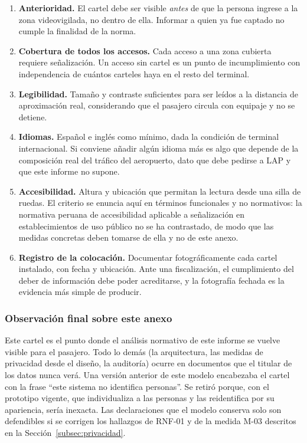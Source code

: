 \begin{enumerate}[leftmargin=1.6em,itemsep=0.35em]
  \item \textbf{Anterioridad.} El cartel debe ser visible \emph{antes} de
        que la persona ingrese a la zona videovigilada, no dentro de
        ella. Informar a quien ya fue captado no cumple la finalidad de
        la norma.
  \item \textbf{Cobertura de todos los accesos.} Cada acceso a una zona
        cubierta requiere señalización. Un acceso sin cartel es un punto
        de incumplimiento con independencia de cuántos carteles haya en
        el resto del terminal.
  \item \textbf{Legibilidad.} Tamaño y contraste suficientes para ser
        leídos a la distancia de aproximación real, considerando que el
        pasajero circula con equipaje y no se detiene.
  \item \textbf{Idiomas.} Español e inglés como mínimo, dada la condición
        de terminal internacional. Si conviene añadir algún idioma más es
        algo que depende de la composición real del tráfico del
        aeropuerto, dato que debe pedirse a LAP y que este informe no
        supone.
  \item \textbf{Accesibilidad.} Altura y ubicación que permitan la
        lectura desde una silla de ruedas. El criterio se enuncia aquí en
        términos funcionales y no normativos: la normativa peruana de
        accesibilidad aplicable a señalización en establecimientos de uso
        público no se ha contrastado, de modo que las medidas concretas
        deben tomarse de ella y no de este anexo.
  \item \textbf{Registro de la colocación.} Documentar fotográficamente
        cada cartel instalado, con fecha y ubicación. Ante una
        fiscalización, el cumplimiento del deber de información debe
        poder acreditarse, y la fotografía fechada es la evidencia más
        simple de producir.
\end{enumerate}

\subsubsection{Observación final sobre este anexo}

Este cartel es el punto donde el análisis normativo de este informe se
vuelve visible para el pasajero. Todo lo demás (la arquitectura, las
medidas de privacidad desde el diseño, la auditoría) ocurre en
documentos que el titular de los datos nunca verá. Una versión anterior
de este modelo encabezaba el cartel con la frase \enquote{este sistema no
identifica personas}. Se retiró porque, con el prototipo vigente, que
individualiza a las personas y las reidentifica por su apariencia, sería
inexacta. Las declaraciones que el modelo conserva solo son defendibles si se
corrigen los hallazgos de RNF-01 y de la medida M-03 descritos en la
Sección~\ref{subsec:privacidad}.

